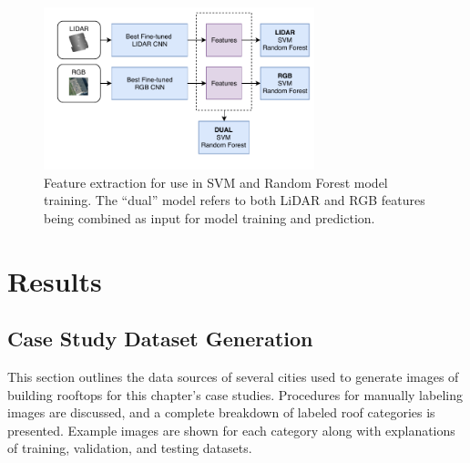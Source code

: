 \begin{figure}[H]
\centering
\includegraphics[width=0.7\textwidth]{chapter_4_roofshape/imgs/CNN_Extraction.pdf}
\vspace{-9PT}

\caption[CNN feature extraction from rooftop data]{Feature extraction for use in SVM and Random Forest model training. The ``dual'' model refers to both LiDAR and RGB features being combined as input for model training and prediction. }
\label{fig:dual_classical}
\end{figure}







\section{Results}
\unskip
\subsection{Case Study Dataset Generation}

This section outlines the data sources of several cities used to generate images of building rooftops for this chapter's case studies. Procedures for manually labeling images are  discussed, and a complete breakdown of labeled roof categories is presented. Example images are shown for each category along with explanations of training, validation, and testing datasets.


